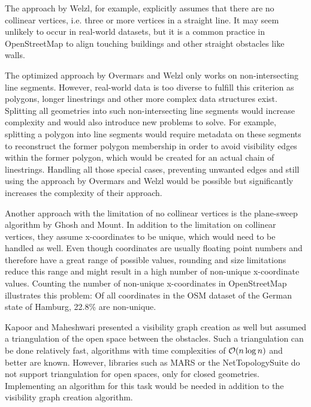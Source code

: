 		The approach by Welzl\cite{welzl-visibility-graph}, for example, explicitly assumes that there are no collinear vertices, i.e. three or more vertices in a straight line.
		It may seem unlikely to occur in real-world datasets, but it is a common practice in OpenStreetMap to align touching buildings and other straight obstacles like walls.
		
		The optimized approach by Overmars and Welzl\cite{overmars-weizl-visibility-graph} only works on non-intersecting line segments.
		However, real-world data is too diverse to fulfill this criterion as polygons, longer linestrings and other more complex data structures exist.
		Splitting all geometries into such non-intersecting line segments would increase complexity and would also introduce new problems to solve.
		For example, splitting a polygon into line segments would require metadata on these segments to reconstruct the former polygon membership in order to avoid visibility edges within the former polygon, which would be created for an actual chain of linestrings.
		Handling all those special cases, preventing unwanted edges and still using the approach by Overmars and Welzl would be possible but significantly increases the complexity of their approach.
		
		Another approach with the limitation of no collinear vertices is the plane-sweep algorithm by Ghosh and Mount\cite{ghosh-output-sensitive-vgraph}.
		In addition to the limitation on collinear vertices, they assume x-coordinates to be unique, which would need to be handled as well.
		Even though coordinates are usually floating point numbers and therefore have a great range of possible values, rounding and size limitations reduce this range and might result in a high number of non-unique x-coordinate values.
		Counting the number of non-unique x-coordinates in OpenStreetMap illustrates this problem:
		Of all coordinates in the OSM dataset of the German state of Hamburg, 22.8\% are non-unique.
		
		Kapoor and Maheshwari presented a visibility graph creation as well\cite{kapoor-shortest-path-vgraph} but assumed a triangulation of the open space between the obstacles.
		Such a triangulation can be done relatively fast, algorithms with time complexities of $\mathcal{O}(n \log{n})$ and better are known\cite[58-60]{de-berg-computational-geometry}.
		However, libraries such as MARS or the NetTopologySuite do not support triangulation for open spaces, only for closed geometries.
		Implementing an algorithm for this task would be needed in addition to the visibility graph creation algorithm.
		
